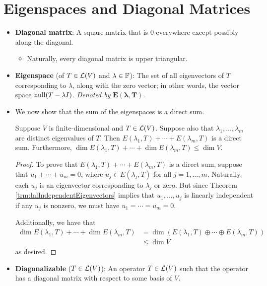 \documentclass[../main.tex]{subfiles}
\begin{document}
\section{Eigenspaces and Diagonal Matrices}
\begin{itemize}
    \item \textbf{Diagonal matrix}: A square matrix that is 0 everywhere except possibly along the diagonal.
    \begin{itemize}
        \item Naturally, every diagonal matrix is upper triangular.
    \end{itemize}
    \item \textbf{Eigenspace} (of $T\in\mathcal{L}(V)$ and $\lambda\in\mathbb{F}$): The set of all eigenvectors of $T$ corresponding to $\lambda$, along with the zero vector; in other words, the vector space $\operatorname{null}(T-\lambda I)$. \emph{Denoted by} $\bm{E(\lambda,T)}$.
    \item We now show that the sum of the eigenspaces is a direct sum.
    \begin{theorem}\label{trm:directSumEigenspaces}
        Suppose $V$ is finite-dimensional and $T\in\mathcal{L}(V)$. Suppose also that $\lambda_1,\dots,\lambda_m$ are distinct eigenvalues of $T$. Then $E(\lambda_1,T)+\cdots+E(\lambda_m,T)$ is a direct sum. Furthermore, $\dim E(\lambda_1,T)+\cdots+\dim E(\lambda_m,T)\leq\dim V$.
        \begin{proof}
            To prove that $E(\lambda_1,T)+\cdots+E(\lambda_m,T)$ is a direct sum, suppose that $u_1+\cdots+u_m=0$, where $u_j\in E(\lambda_j,T)$ for all $j=1,\dots,m$. Naturally, each $u_j$ is an eigenvector corresponding to $\lambda_j$ or zero. But since Theorem \ref{trm:lnlIndependentEigenvectors} implies that $u_1,\dots,u_j$ is linearly independent if any $u_j$ is nonzero, we must have $u_1=\cdots=u_m=0$.\par
            Additionally, we have that
            \begin{align*}
                \dim E(\lambda_1,T)+\cdots+\dim E(\lambda_m,T) &= \dim(E(\lambda_1,T)\oplus\cdots\oplus E(\lambda_m,T))\\
                &\leq \dim V
            \end{align*}
            as desired.
        \end{proof}
    \end{theorem}
    \item \textbf{Diagonalizable} ($T\in\mathcal{L}(V)$): An operator $T\in\mathcal{L}(V)$ such that the operator has a diagonal matrix with respect to some basis of $V$.

\end{itemize}
\end{document}

